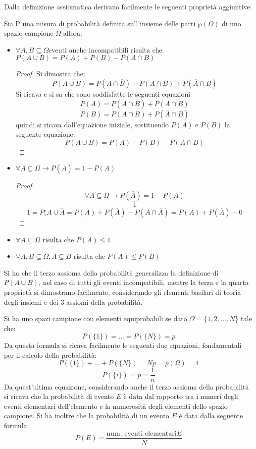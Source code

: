 \documentclass[a4paper,12pt, oneside]{book}
\begin{document}
Dalla definizione assiomatica derivano facilmente le seguenti proprietà aggiuntive:
\begin{definizione}
Sia P una misura di probabilità definita sull'insieme delle parti $\wp(\Omega)$ di uno
spazio campione $\Omega$ allora:
    \begin{itemize}
        \item $\forall A, B \subseteq \Omega \mbox{eventi anche incompatibili}$ risulta che
                $P(A \cup B) = P(A) + P(B) - P(A \cap B)$
                \begin{proof}
                 Si dimostra che:
                \[ P(A \cup B) = P(A \cap \overline{B}) + P(A \cap B) + P(\overline{A} \cap B)\]
                 Si ricava e si sa che sono soddisfatte le seguenti equazioni
                 \[P(A) = P(A \cap \overline{B}) + P(A \cap B) \]
                 \[P(B) = P(A \cap B) + P(\overline{A} \cap B) \]
                        quindi si ricava dall'equazione iniziale, sostituendo $P(A)$ e $P(B)$ la seguente equazione:
                    \[P(A \cup B) = P(A) + P(B) - P(A \cap B)\]
                \end{proof}
        \item $\forall A \subseteq \Omega \to P(\overline{A}) = 1 - P(A)$
              \begin{proof}
                    \[  \forall A\subseteq \Omega \to P(\overline{A})=1-P(A)\]
                        \[\downarrow\]
                    \[ 1 = P(A \cup \overline{A} = P(A) + P(\overline{A}) - P(A \cap \overline{A}) = P(A) + P(\overline{A}) - 0\]
              \end{proof}
        \item $\forall A\subseteq \Omega$ risulta che $ P(A)\leq 1$
        \item $\forall A,B\subseteq \Omega, A\subseteq B$ risulta che $P(A)\leq P(B)$
    \end{itemize}
\end{definizione}
Si ha che il terzo assioma della probabilità generalizza la definizione di $P(A \cup B)$,
nel caso di tutti gli eventi incompatibili, mentre la terza e la quarta proprietà si dimostrano facilmente,
considerando gli elementi basilari di teoria degli insiemi e dei 3 assiomi della probabilità.

Si ha uno spazi campione con elementi equiprobabili se dato $\Omega = \{1, 2, \dots, N\}$ tale che:
\[P(\{1\}) = \dots = P(\{N\}) = p \]
Da questa formula si ricava facilmente le seguenti due equazioni, fondamentali per il calcolo della probabilità:
\[P(\{1\}) + \dots + P(\{N\}) = Np = p(\Omega) = 1\]
\[P(\{i\}) = p = \frac{1}{n}\]
Da quest'ultima equazione, considerando anche il terzo assioma della probabilità si ricava che la probabilità
di evento $E$ è data dal rapporto tra i numeri degli eventi elementari dell'elemento e la numerosità degli
elementi dello spazio campione.\newline
Si ha inoltre che la probabilità di un evento $E$ è data dalla seguente formula
\[ P(E) = \frac{\mbox{num. eventi elementari} E}{N} \]
\end{document}

